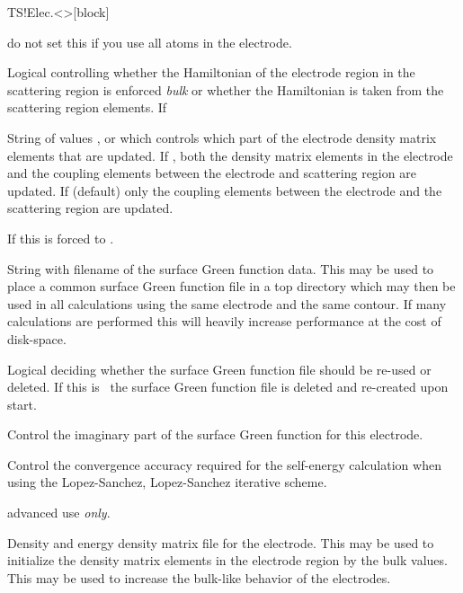 \begin{fdfentry}{TS!Elec.<>}[block]
\begin{fdfoptions}
    \note do not set this if you use all atoms in the electrode.

    \option[Bulk]%
    Logical controlling whether the Hamiltonian of the electrode
    region in the scattering region is enforced \emph{bulk} or whether
    the Hamiltonian is taken from the scattering region elements. If

    \option[DM-update]%
    String of values ,  or 
    which controls which part of the electrode density matrix elements
    that are updated. If , both the density matrix elements
    in the electrode and the coupling elements between the electrode
    and scattering region are updated. If  (default)
    only the coupling elements between the electrode and the
    scattering region are updated.

    If  this is forced to .

    \option[Gf]%
    String with filename of the surface Green function data. This may
    be used to place a common surface Green function file in a top
    directory which may then be used in all calculations using the
    same electrode and the same contour. 
    If many calculations are performed this will heavily increase
    performance at the cost of disk-space.

    \option[Gf-Reuse]%
    Logical deciding whether the surface Green function file should be
    re-used or deleted.
    If this is \fdffalse\ the surface Green function file is deleted
    and re-created upon start.
    
    \option[Eta]%
    Control the imaginary part of the surface Green function for this
    electrode.

    \option[Accuracy]%
    Control the convergence accuracy required for the self-energy
    calculation when using the Lopez-Sanchez, Lopez-Sanchez iterative
    scheme. 

    \note advanced use \emph{only}.
    
    \option[DE]%
    Density and energy density matrix file for the electrode. This may
    be used to initialize the density matrix elements in the electrode
    region by the bulk values. This may be used to increase the
    bulk-like behavior of the electrodes. 


\end{fdfoptions}
\end{fdfentry}

